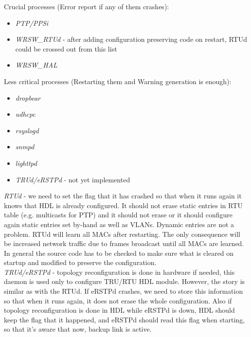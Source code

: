 \begin{packed_enum}
				Crucial processes (Error report if any of them crashes):
				\begin{itemize}
					\item \emph{PTP/PPSi}
					\item \emph{WRSW\_RTUd} - after adding configuration preserving code
						on restart, RTUd could be crossed out from this list
					\item \emph{WRSW\_HAL}
				\end{itemize}
				Less critical processes (Restarting them and Warning generation is
				enough):
				\begin{itemize}
					\item \emph{dropbear}
					\item \emph{udhcpc}
					\item \emph{rsyslogd}
					\item \emph{snmpd}
					\item \emph{lighttpd}
					\item \emph{TRUd/eRSTPd} - not yet implemented
				\end{itemize}

				\emph{RTUd} - we need to set the flag that it has crashed so that when
				it runs again it knows that HDL is already configured. It should not
				erase static entries in RTU table (e.g. multicasts for PTP) and it
				should not erase or it should configure again static entries set by-hand
				as well as VLANs. Dynamic entries are not a problem. RTUd will learn all
				MACs after restarting. The only consequence will be increased network
				traffic due to frames broadcast until all MACs are learned. In general
				the source code has to be checked to make sure what is cleared on
				startup and modified to preserve the configuration.\\

				\emph{TRUd/eRSTPd} - topology reconfiguration is done in hardware if
				needed, this daemon is used only to configure TRU/RTU HDL module.
				However, the story is similar as with the RTUd. If eRSTPd crashes, we
				need to store this information so that when it runs again, it does not
				erase the whole configuration. Also if topology reconfiguration is done
				in HDL while eRSTPd is down, HDL should keep the flag that it happened,
				and eRSTPd should read this flag when starting, so that it's aware that
				now, backup link is active.\\
		\end{packed_enum}

